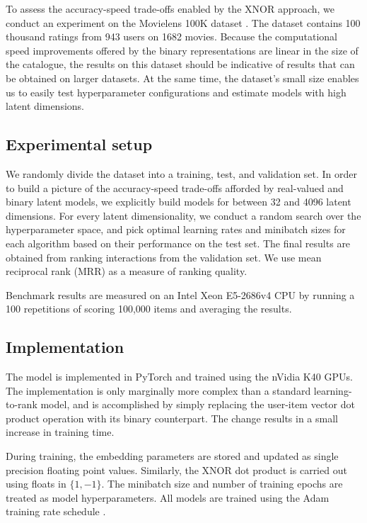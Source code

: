 \documentclass[sigchi]{acmart}
\begin{document}
To assess the accuracy-speed trade-offs enabled by the XNOR approach, we conduct an experiment on the Movielens 100K dataset \citep{harper2016movielens}. The dataset contains 100 thousand ratings from 943 users on 1682 movies. Because the computational speed improvements offered by the binary representations are linear in the size of the catalogue, the results on this dataset should be indicative of results that can be obtained on larger datasets. At the same time, the dataset's small size enables us to easily test hyperparameter configurations and estimate models with high latent dimensions.

\subsection{Experimental setup}
We randomly divide the dataset into a training, test, and validation set. In order to build a picture of the accuracy-speed trade-offs afforded by real-valued and binary latent models, we explicitly build models for between 32 and 4096 latent dimensions. For every latent dimensionality, we conduct a random search over the hyperparameter space, and pick optimal learning rates and minibatch sizes for each algorithm based on their performance on the test set. The final results are obtained from ranking interactions from the validation set. We use mean reciprocal rank (MRR) as a measure of ranking quality.

Benchmark results are measured on an Intel Xeon E5-2686v4 CPU by running a 100 repetitions of scoring 100,000 items and averaging the results.

\subsection{Implementation}
The model is implemented in PyTorch and trained using the nVidia K40 GPUs. The implementation is only marginally more complex than a standard learning-to-rank model, and is accomplished by simply replacing the user-item vector dot product operation with its binary counterpart. The change results in a small increase in training time.

During training, the embedding parameters are stored and updated as single precision floating point values. Similarly, the XNOR dot product is carried out using floats in $\{1, -1\}$. The minibatch size and number of training epochs are treated as model hyperparameters. All models are trained using the Adam training rate schedule \citep{kingma2014adam}.
\end{document}
